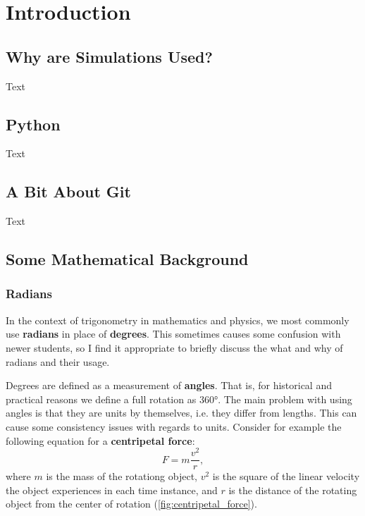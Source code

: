 \chapter{Introduction}

\section{Why are Simulations Used?}
Text

\section{Python}
Text
\section{A Bit About Git}
Text

\section{Some Mathematical Background}
\subsection{Radians}
In the context of trigonometry in mathematics and physics, we most commonly use \textbf{radians} in place of \textbf{degrees}. This sometimes causes some confusion with newer students, so I find it appropriate to briefly discuss the what and why of radians and their usage.

Degrees are defined as a measurement of \textbf{angles}. That is, for historical and practical reasons we define a full rotation as $\ang{360}$. The main problem with using angles is that they are units by themselves, i.e. they differ from lengths. This can cause some consistency issues with regards to units. Consider for example the following equation for a \textbf{centripetal force}:
\begin{equation}
  F = m\frac{v^{2}}{r},
  \label{eq:centripetal_force_velocity}
\end{equation}
where $m$ is the mass of the rotationg object, $v^{2}$ is the square of the linear velocity the object experiences in each time instance, and $r$ is the distance of the rotating object from the center of rotation (\autoref{fig:centripetal_force}).


